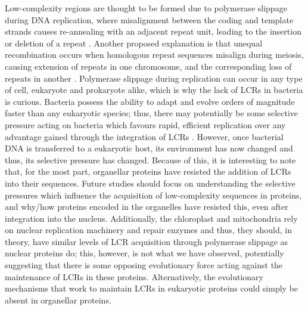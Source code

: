 \documentclass[a4paper,12pt]{article}
\begin{document}
\begin{multicols}{2}
Low-complexity regions are thought to be formed due to polymerase
slippage during DNA replication, where misalignment between the
coding and template strands causes re-annealing with an adjacent
repeat unit, leading to the insertion or deletion of a repeat
\citep{EnrightEtAl2023}. Another proposed explanation is that unequal
recombination occurs when homologous repeat sequences misalign
during meiosis, causing extension of repeats in one chromosome, and
the corresponding loss of repeats in another \citep{EnrightEtAl2023}. Polymerase
slippage during replication can occur in any type of cell, eukaryote
and prokaryote alike, which is why the lack of LCRs in bacteria
is curious. Bacteria possess the ability to adapt and evolve orders
of magnitude faster than any eukaryotic species; thus, there may
potentially be some selective pressure
acting on bacteria which favours rapid, efficient replication over
any advantage gained through the integration of LCRs
\citep{MierAndrade-Navarro2021}. However, once
bacterial DNA is transferred to a eukaryotic host, its environment has now changed and
thus, its selective pressure has changed. Because of this, it is
interesting to note that, for the most part, organellar proteins have resisted the addition of LCRs
into their sequences. Future studies should focus on understanding the selective pressures which
influence the acquisition of low-complexity sequences in proteins,
and why/how proteins encoded in the organelles have resisted this,
even after integration into the nucleus. 
Additionally, the
chloroplast and mitochondria rely on nuclear replication machinery
and repair enzymes \citep{Wood:08} and thus, they should, in theory, have similar
levels of LCR acquisition through polymerase slippage as nuclear
proteins do; this, however, is not what we have observed,
potentially suggesting that there is some opposing evolutionary
force acting against the maintenance of LCRs in these proteins.
Alternatively, the evolutionary mechanisms that work to maintain
LCRs in eukaryotic proteins could simply be absent in organellar
proteins.



\end{multicols}
\end{document}
